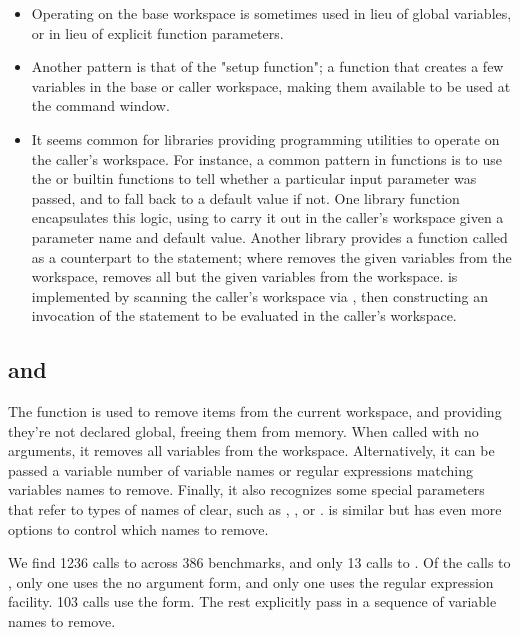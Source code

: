 \begin{itemize}

  \item Operating on the base workspace is sometimes used in lieu of global
    variables, or in lieu of explicit function parameters.

  \item Another pattern is that of the "setup function"; a function that
    creates a few variables in the base or caller workspace, making them
    available to be used at the \matlab command window.

  \item It seems common for libraries providing programming utilities to
    operate on the caller's workspace. For instance, a common pattern in
    \matlab functions is to use the  or  builtin
    functions to tell whether a particular input parameter was passed, and to
    fall back to a default value if not. One library function encapsulates this
    logic, using  to carry it out in the caller's workspace given
    a parameter name and default value. Another library provides a function
    called  as a counterpart to the  statement; where
     removes the given variables from the workspace, 
    removes all but the given variables from the workspace.  is
    implemented by scanning the caller's workspace via , then
    constructing an invocation of the  statement to be evaluated in
    the caller's workspace.

\end{itemize}

\subsection{ and }

The  function is used to remove items from the current workspace,
and providing they're not declared global, freeing them from memory. When
called with no arguments, it removes all variables from the workspace.
Alternatively, it can be passed a variable number of variable names or regular
expressions matching variables names to remove. Finally, it also recognizes
some special parameters that refer to types of names of clear, such as
, , or .  is similar
but has even more options to control which names to remove.

We find 1236 calls to  across 386 benchmarks, and only 13 calls to
. Of the calls to , only one uses the no argument
form, and only one uses the regular expression facility. 103 calls use the
 form. The rest explicitly pass in a sequence of variable names
to remove.

